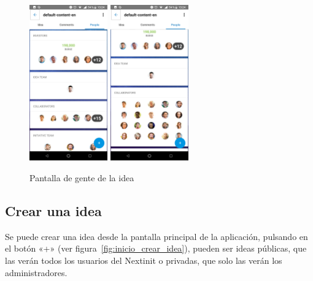 \begin{figure}[!h]
	\begin{center}
		\includegraphics[width=0.3\textwidth]{./img/anexo1/ver_idea_gente.png}
		\includegraphics[width=0.3\textwidth]{./img/anexo1/ver_idea_gente_expandido.png}
		\caption{Pantalla de gente de la idea}
		\label{fig:ver_idea_gente}
	\end{center}
\end{figure}

\subsection{Crear una idea}

Se puede crear una idea desde la pantalla principal de la aplicación, pulsando en el botón 
«+» (ver figura~\ref{fig:inicio_crear_idea}), pueden ser ideas públicas, que las verán todos 
los usuarios del Nextinit o privadas, que solo las verán los administradores.

